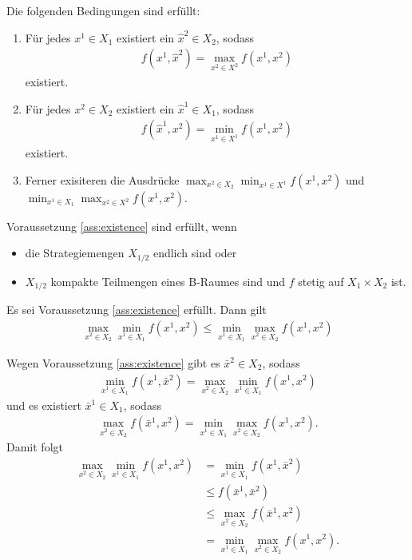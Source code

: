 \begin{voraussetzung}\label{ass:existence} Die folgenden Bedingungen sind erfüllt:
  \begin{enumerate}
  \item Für jedes $x^{1} \in X_{1}$ existiert ein $\hat x^{2} \in X_{2}$, sodass
    \begin{align*}
      f(x^{1}, \hat x^{2}) = \max_{x^{2} \in X^{2}}f(x^{1}, x^{2})
    \end{align*}
existiert. 
\item Für jedes $x^{2} \in X_{2}$ existiert ein $\hat x^{1} \in X_{1}$, sodass
   \begin{align*}
      f(\hat x^{1}, x^{2}) = \min_{x^{1} \in X^{1}}f(x^{1}, x^{2})
    \end{align*}
existiert. 
\item Ferner exisiteren die Ausdrücke $\max_{x^{2} \in X_{2}}\min_{x^{1} \in X^{1}}f(x^{1}, x^{2})$ und $\min_{x^{1} \in X_{1}}\max_{x^{2} \in X^{2}}f(x^{1}, x^{2})$.
  \end{enumerate}
\end{voraussetzung}
\begin{bemerkung*}
  Voraussetzung \ref{ass:existence} sind erfüllt, wenn
  \begin{itemize}
  \item die Strategiemengen $X_{1/2}$ endlich sind oder
  \item $X_{1/2}$ kompakte Teilmengen eines B-Raumes sind und $f$ stetig auf $X_{1} \times X_{2}$ ist.  
  \end{itemize}
\end{bemerkung*}
\begin{lemma}\label{lem:minmax}
  Es sei Voraussetzung \ref{ass:existence} erfüllt. Dann gilt
  \begin{align*}
    \max_{x^{2} \in X_{2}} \min_{x^{1} \in X_{1}} f(x^{1}, x^{2}) \leq \min_{x^{1} \in X_{1}} \max_{x^{2} \in X_{2}} f(x^{1}, x^{2})
  \end{align*}
\end{lemma}
\begin{beweis}
  Wegen Voraussetzung \ref{ass:existence} gibt es $\bar x^{2} \in X_{2}$, sodass
  \begin{align*}
    \min_{x^{1} \in X_{1}}f(x^{1}, \bar x^{2}) = \max_{x^{2} \in X_{2}}\min_{x^{1} \in X_{1}}f(x^{1}, x^{2})
  \end{align*}
und es existiert $\bar x^{1} \in X_{1}$, sodass
\begin{align*}
    \max_{x^{2} \in X_{2}}f(\bar x^{1}, x^{2}) = \min_{x^{1} \in X_{1}}\max_{x^{2} \in X_{2}} f(x^{1}, x^{2}).
\end{align*}
Damit folgt
\begin{align*}
  \max_{x^{2} \in X_{2}}\min_{x^{1} \in X_{1}}f(x^{1}, x^{2}) &= \min_{x^{1} \in X_{1}}f(x^{1}, \bar x^{2})\\
&\leq f(\bar x^{1}, \bar x^{2})\\
&\leq  \max_{x^{2} \in X_{2}}f(\bar x^{1}, x^{2})\\
&=\min_{x^{1} \in X_{1}}\max_{x^{2} \in X_{2}} f(x^{1}, x^{2}).
\end{align*}
\end{beweis}
